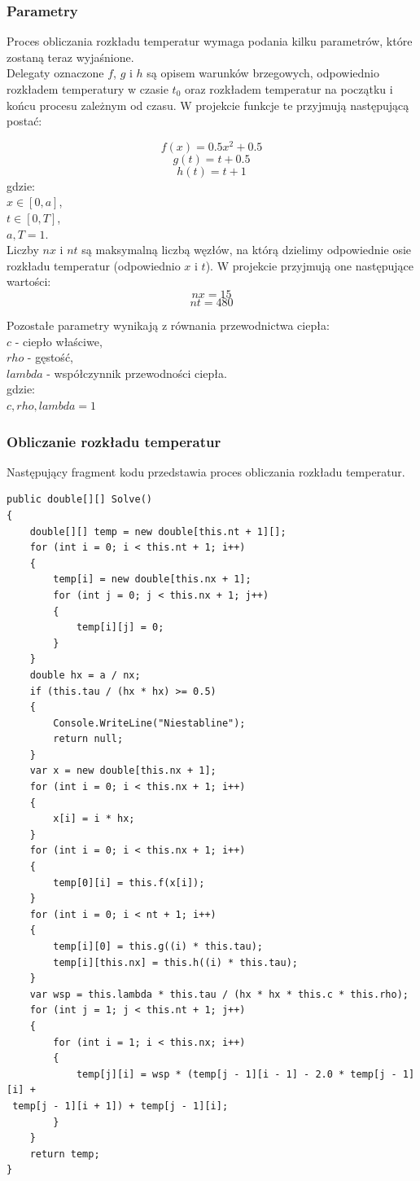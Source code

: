\documentclass[twoside]{projektInzynierskiMS1}
\newcommand{\si}{ś}
\begin{document}
\subsubsection{Parametry}
Proces obliczania rozkładu temperatur wymaga podania kilku parametrów, które zostaną teraz wyja\si nione. \\
Delegaty oznaczone $f$, $g$ i $h$ są opisem warunków brzegowych, odpowiednio rozkładem temperatury w czasie $t_0$ oraz rozkładem temperatur na początku i końcu procesu zależnym od czasu. W projekcie funkcje te przyjmują następującą postać:

\[ f(x) = 0.5 x^2 + 0.5 \] 
\[ g(t) = t + 0.5 \] 
\[ h(t) = t + 1 \] 
\noindent gdzie: \\
$ x \in [0, a] $, \\
$ t \in [0, T] $, \\
$ a, T = 1$. \\

Liczby $nx$ i $nt$ są maksymalną liczbą węzłów, na którą dzielimy odpowiednie osie rozkładu temperatur (odpowiednio $x$ i $t$). W projekcie przyjmują one następujące warto\si ci: 
\[ nx = 15 \]
\[nt = 480 \]

Pozostałe parametry wynikają z równania przewodnictwa ciepła: \\
$c$ - ciepło wła\si ciwe,\\
$rho$ - gęsto\si ć,\\
$lambda$ - współczynnik przewodno\si ci ciepła.\\

\noindent  gdzie: \\
$ c, rho, lambda = 1 $

\subsubsection{Obliczanie rozkładu temperatur}
Następujący fragment kodu przedstawia proces obliczania rozkładu temperatur.

\begin{verbatim}
public double[][] Solve()
{
    double[][] temp = new double[this.nt + 1][];
    for (int i = 0; i < this.nt + 1; i++)
    {
        temp[i] = new double[this.nx + 1];
        for (int j = 0; j < this.nx + 1; j++)
        {
            temp[i][j] = 0;
        }
    }
    double hx = a / nx;
    if (this.tau / (hx * hx) >= 0.5)
    {
        Console.WriteLine("Niestabline");
        return null;
    }
    var x = new double[this.nx + 1];
    for (int i = 0; i < this.nx + 1; i++)
    {
        x[i] = i * hx;
    }
    for (int i = 0; i < this.nx + 1; i++)
    {
        temp[0][i] = this.f(x[i]);
    }
    for (int i = 0; i < nt + 1; i++)
    {
        temp[i][0] = this.g((i) * this.tau);
        temp[i][this.nx] = this.h((i) * this.tau);
    }
    var wsp = this.lambda * this.tau / (hx * hx * this.c * this.rho);
    for (int j = 1; j < this.nt + 1; j++)
    {
        for (int i = 1; i < this.nx; i++)
        {
            temp[j][i] = wsp * (temp[j - 1][i - 1] - 2.0 * temp[j - 1][i] +
 temp[j - 1][i + 1]) + temp[j - 1][i];
        }
    }
    return temp;
}   
\end{verbatim}
\end{document}
